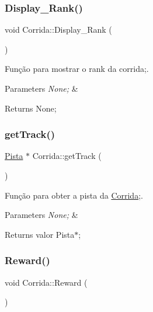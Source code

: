 \subsubsection{\texorpdfstring{Display\+\_\+\+Rank()}{Display\_Rank()}}
{\footnotesize\ttfamily void Corrida\+::\+Display\+\_\+\+Rank (\begin{DoxyParamCaption}{ }\end{DoxyParamCaption})}



Função para mostrar o rank da corrida;. 


\begin{DoxyParams}{Parameters}
{\em None;} & \\
\hline
\end{DoxyParams}
\begin{DoxyReturn}{Returns}
None; 
\end{DoxyReturn}
\mbox{\label{class_corrida_a9f47d8a01df3c59c3597b75bbb865458}} 
\subsubsection{\texorpdfstring{get\+Track()}{getTrack()}}
{\footnotesize\ttfamily \mbox{\hyperlink{class_pista}{Pista}} $\ast$ Corrida\+::get\+Track (\begin{DoxyParamCaption}{ }\end{DoxyParamCaption})}



Função para obter a pista da \mbox{\hyperlink{class_corrida}{Corrida}};. 


\begin{DoxyParams}{Parameters}
{\em None;} & \\
\hline
\end{DoxyParams}
\begin{DoxyReturn}{Returns}
valor Pista$\ast$; 
\end{DoxyReturn}
\mbox{\label{class_corrida_a389a44a45d0a045ba21939834c9fdfdd}} 
\subsubsection{\texorpdfstring{Reward()}{Reward()}}
{\footnotesize\ttfamily void Corrida\+::\+Reward (\begin{DoxyParamCaption}{ }\end{DoxyParamCaption})}



